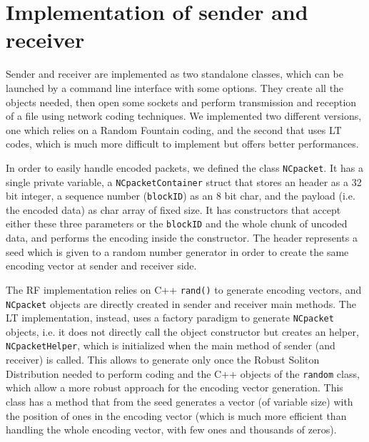 \section{Implementation of sender and receiver}
Sender and receiver are implemented as two standalone classes, which can be launched by a command line interface with some options. They create all the objects needed, then open some sockets and perform transmission and reception of a file using network coding techniques. We implemented two different versions, one which relies on a Random Fountain coding, and the second that uses LT codes, which is much more difficult to implement but offers better performances.

In order to easily handle encoded packets, we defined the class \texttt{NCpacket}. It has a single private variable, a \texttt{NCpacketContainer} struct that stores an header as a 32 bit integer, a sequence number (\texttt{blockID}) as an 8 bit char, and the payload (i.e. the encoded data) as char array of fixed size. It has constructors that accept either these three parameters or the \texttt{blockID} and the whole chunk of uncoded data, and performs the encoding inside the constructor. 
The header represents a seed which is given to a random number generator in order to create the same encoding vector at sender and receiver side. 

The RF implementation relies on C++ \texttt{rand()} to generate encoding vectors, and \texttt{NCpacket} objects are directly created in sender and receiver main methods.
The LT implementation, instead, uses a factory paradigm to generate \texttt{NCpacket} objects, i.e. it does not directly call the object constructor but creates an helper, \texttt{NCpacketHelper}, which is initialized when the main method of sender (and receiver) is called. This allows to generate only once the Robust Soliton Distribution needed to perform coding and the C++ objects of the \texttt{random} class, which allow a more robust approach for the encoding vector generation. This class has a method that from the seed generates a vector (of variable size) with the position of ones in the encoding vector (which is much more efficient than handling the whole encoding vector, with few ones and thousands of zeros).

